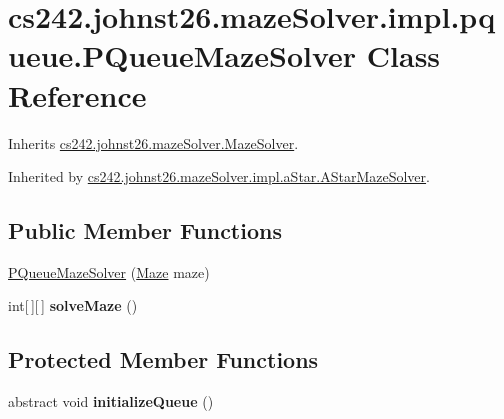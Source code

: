\hypertarget{classcs242_1_1johnst26_1_1maze_solver_1_1impl_1_1pqueue_1_1_p_queue_maze_solver}{\section{cs242.\-johnst26.\-maze\-Solver.\-impl.\-pqueue.\-P\-Queue\-Maze\-Solver Class Reference}
\label{classcs242_1_1johnst26_1_1maze_solver_1_1impl_1_1pqueue_1_1_p_queue_maze_solver}
}


Inherits \hyperlink{interfacecs242_1_1johnst26_1_1maze_solver_1_1_maze_solver}{cs242.\-johnst26.\-maze\-Solver.\-Maze\-Solver}.



Inherited by \hyperlink{classcs242_1_1johnst26_1_1maze_solver_1_1impl_1_1a_star_1_1_a_star_maze_solver}{cs242.\-johnst26.\-maze\-Solver.\-impl.\-a\-Star.\-A\-Star\-Maze\-Solver}.

\subsection*{Public Member Functions}
\begin{DoxyCompactItemize}
\item 
\hyperlink{classcs242_1_1johnst26_1_1maze_solver_1_1impl_1_1pqueue_1_1_p_queue_maze_solver_afe29290be0ec3f79fd51523ea258246d}{P\-Queue\-Maze\-Solver} (\hyperlink{interfacecs242_1_1johnst26_1_1maze_1_1_maze}{Maze} maze)
\item 
\hypertarget{classcs242_1_1johnst26_1_1maze_solver_1_1impl_1_1pqueue_1_1_p_queue_maze_solver_aed514a462d7ede4e0665a215ecdae996}{int\mbox{[}$\,$\mbox{]}\mbox{[}$\,$\mbox{]} {\bfseries solve\-Maze} ()}\label{classcs242_1_1johnst26_1_1maze_solver_1_1impl_1_1pqueue_1_1_p_queue_maze_solver_aed514a462d7ede4e0665a215ecdae996}

\end{DoxyCompactItemize}
\subsection*{Protected Member Functions}
\begin{DoxyCompactItemize}
\item 
\hypertarget{classcs242_1_1johnst26_1_1maze_solver_1_1impl_1_1pqueue_1_1_p_queue_maze_solver_a3b03388133ab392e935fe3b818d58d85}{abstract void {\bfseries initialize\-Queue} ()}\label{classcs242_1_1johnst26_1_1maze_solver_1_1impl_1_1pqueue_1_1_p_queue_maze_solver_a3b03388133ab392e935fe3b818d58d85}

\end{DoxyCompactItemize}

